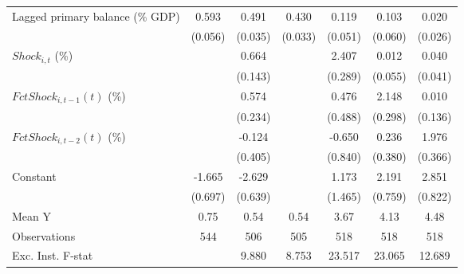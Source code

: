 {\begin{tabular}{l*{6}{c}}
\addlinespace
Lagged primary balance (\% GDP)&       0.593\sym{***}&       0.491\sym{***}&       0.430\sym{***}&       0.119\sym{**} &       0.103\sym{*}  &       0.020         \\
                    &     (0.056)         &     (0.035)         &     (0.033)         &     (0.051)         &     (0.060)         &     (0.026)         \\
\addlinespace
$ Shock_{i,t}$ (\%) &                     &       0.664\sym{***}&                     &       2.407\sym{***}&       0.012         &       0.040         \\
                    &                     &     (0.143)         &                     &     (0.289)         &     (0.055)         &     (0.041)         \\
\addlinespace
$ FctShock_{i,t-1}(t)$ (\%)&                     &       0.574\sym{**} &                     &       0.476         &       2.148\sym{***}&       0.010         \\
                    &                     &     (0.234)         &                     &     (0.488)         &     (0.298)         &     (0.136)         \\
\addlinespace
$ FctShock_{i,t-2}(t)$ (\%)&                     &      -0.124         &                     &      -0.650         &       0.236         &       1.976\sym{***}\\
                    &                     &     (0.405)         &                     &     (0.840)         &     (0.380)         &     (0.366)         \\
\addlinespace
Constant            &      -1.665\sym{**} &      -2.629\sym{***}&                     &       1.173         &       2.191\sym{***}&       2.851\sym{***}\\
                    &     (0.697)         &     (0.639)         &                     &     (1.465)         &     (0.759)         &     (0.822)         \\
\midrule
Mean Y              &        0.75         &        0.54         &        0.54         &        3.67         &        4.13         &        4.48         \\
Observations        &         544         &         506         &         505         &         518         &         518         &         518         \\
Exc. Inst. F-stat   &                     &       9.880         &       8.753         &      23.517         &      23.065         &      12.689         \\
\bottomrule
\end{tabular}
}
